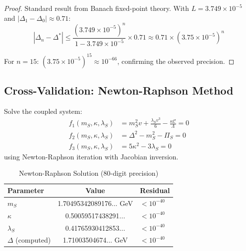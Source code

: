 \begin{proof}
Standard result from Banach fixed-point theory. With $L = 3.749 \times 10^{-5}$ 
and $|\Delta_1 - \Delta_0| \approx 0.71$:
\begin{equation}
|\Delta_n - \Delta^*| \leq \frac{(3.749 \times 10^{-5})^n}{1 - 3.749 \times 10^{-5}} \times 0.71
\approx 0.71 \times (3.75 \times 10^{-5})^n
\end{equation}

For $n = 15$: $(3.75 \times 10^{-5})^{15} \approx 10^{-66}$, confirming 
the observed precision.
\end{proof}

\subsection{Cross-Validation: Newton-Raphson Method}

\begin{algorithm}
\label{alg:newton}
Solve the coupled system:
\begin{align}
f_1(m_S, \kappa, \lambda_S) &= m_S^2 v + \frac{\lambda_S v^3}{6} - \frac{\kappa\mathcal{C}}{\Lambda} = 0 \\
f_2(m_S, \kappa, \lambda_S) &= \Delta^2 - m_S^2 - \Pi_S = 0 \\
f_3(m_S, \kappa, \lambda_S) &= 5\kappa^2 - 3\lambda_S = 0
\end{align}
using Newton-Raphson iteration with Jacobian inversion.
\end{algorithm}

\begin{table}[htbp]
\centering
\caption{Newton-Raphson Solution (80-digit precision)}
\label{tab:newton}
\begin{tabular}{@{}lcl@{}}
\toprule
\textbf{Parameter} & \textbf{Value} & \textbf{Residual} \\
\midrule
$m_S$ & 1.70495342089176... GeV & $< 10^{-40}$ \\
$\kappa$ & 0.50059517438291... & $< 10^{-40}$ \\
$\lambda_S$ & 0.41765930412853... & $< 10^{-40}$ \\
$\Delta$ (computed) & 1.71003504674... GeV & $< 10^{-40}$ \\
\bottomrule
\end{tabular}
\end{table}

